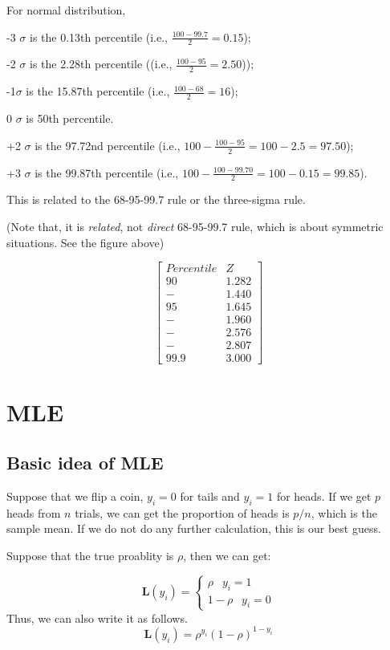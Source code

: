 \documentclass[]{book}
\begin{document}
For normal distribution,

-3 \(\sigma\) is the 0.13th percentile (i.e., \(\frac{100-99.7}{2}=0.15\));

-2 \(\sigma\) is the 2.28th percentile ((i.e., \(\frac{100-95}{2}=2.50\)));

-1\(\sigma\) is the 15.87th percentile (i.e., \(\frac{100-68}{2}=16\));

0 \(\sigma\) is 50th percentile.

+2 \(\sigma\) is the 97.72nd percentile (i.e., \(100-\frac{100-95}{2}=100-2.5=97.50\));

+3 \(\sigma\) is the 99.87th percentile (i.e., \(100-\frac{100-99.70}{2}=100-0.15=99.85\)).

This is related to the 68-95-99.7 rule or the three-sigma rule.

(Note that, it is \emph{related}, not \emph{direct} 68-95-99.7 rule, which is about symmetric situations. See the figure above)

\[\begin{bmatrix}
Percentile & Z \\
90  & 1.282 \\
- & 1.440 \\
95 & 1.645 \\
- & 1.960 \\
- & 2.576 \\
- & 2.807 \\
99.9 & 3.000 \end{bmatrix}\]

\hypertarget{intro}{%
\chapter{MLE}\label{intro}}

\hypertarget{basic-idea-of-mle}{%
\section{Basic idea of MLE}\label{basic-idea-of-mle}}

Suppose that we flip a coin, \(y_i=0\) for tails and \(y_i=1\) for heads. If we get \(p\) heads from \(n\) trials, we can get the proportion of heads is \(p/n\), which is the sample mean. If we do not do any further calculation, this is our best guess.

Suppose that the true proablity is \(\rho\), then we can get:

\[
\mathbf{L}(y_i)=\begin{cases} \rho \;\;\:   y_i = 1 \\ 1-\rho \;\;\:  y_i = 0 \end{cases}
\]
Thus, we can also write it as follows.
\[\mathbf{L}(y_i) = \rho^{y_i}(1-\rho)^{1-y_i}\]
\end{document}
